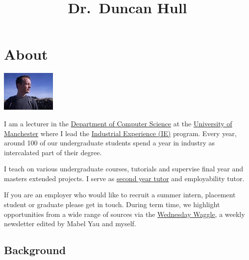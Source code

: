 \documentclass[12pt,]{book}
\title{Dr.~Duncan Hull}
\author{}
\date{}
\begin{document}
\maketitle

{
\setcounter{tocdepth}{1}
\tableofcontents
}
\hypertarget{about}{%
\chapter*{About}\label{about}}

\begin{center}\includegraphics[width=0.25\linewidth]{images/me-blue} \end{center}

I am a lecturer in the \href{https://www.cs.manchester.ac.uk/}{Department of Computer Science} at the \href{https://www.manchester.ac.uk}{University of Manchester} where I lead the \href{https://www.cs.manchester.ac.uk/study/undergraduate/industrial-experience/}{Industrial Experience (IE)} program. Every year, around 100 of our undergraduate students spend a year in industry as intercalated part of their degree.

I teach on various undergraduate courses, tutorials and supervise final year and masters extended projects. I serve as \href{http://studentnet.cs.manchester.ac.uk/ugt/year2/}{second year tutor} and employability tutor.

If you are an employer who would like to recruit a summer intern, placement student or graduate please get in touch. During term time, we highlight opportunities from a wide range of sources via the \href{https://waggle.cs.manchester.ac.uk/waggle/about}{Wednesday Waggle}, a weekly newsletter edited by Mabel Yau and myself.

\hypertarget{background}{%
\section*{Background}\label{background}}
\end{document}
